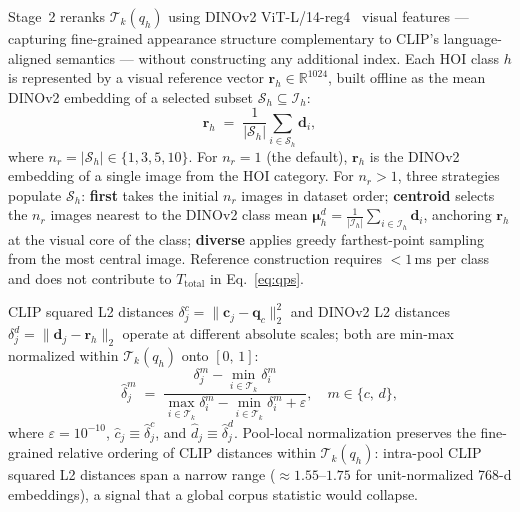 \documentclass[sigconf, nonacm]{acmart}
\theoremstyle{definition}
\begin{document}
Stage~2 reranks $\mathcal{T}_k(q_h)$ using DINOv2 ViT-L/14-reg4~\cite{oquab2024dinov2}
visual features --- capturing fine-grained appearance structure complementary to
CLIP's language-aligned semantics --- without constructing any additional index.
Each HOI class $h$ is represented by a visual reference vector
$\mathbf{r}_h \in \mathbb{R}^{1024}$, built offline as the mean DINOv2 embedding
of a selected subset $\mathcal{S}_h \subseteq \mathcal{I}_h$:
\begin{equation}
  \mathbf{r}_h \;=\; \frac{1}{|\mathcal{S}_h|} \sum_{i \in \mathcal{S}_h} \mathbf{d}_i ,
  \label{eq:refvec}
\end{equation}
where $n_r = |\mathcal{S}_h| \in \{1, 3, 5, 10\}$.
For $n_r{=}1$ (the default), $\mathbf{r}_h$ is the DINOv2 embedding of a single image
from the HOI category.
For $n_r{>}1$, three strategies populate $\mathcal{S}_h$:
\textbf{first} takes the initial $n_r$ images in dataset order;
\textbf{centroid} selects the $n_r$ images nearest to the DINOv2 class mean
$\boldsymbol{\mu}_h^d = \frac{1}{|\mathcal{I}_h|}\sum_{i \in \mathcal{I}_h}\mathbf{d}_i$,
anchoring $\mathbf{r}_h$ at the visual core of the class;
\textbf{diverse} applies greedy farthest-point sampling from the most central image.
Reference construction requires ${<}1$\,ms per class and does not contribute to
$T_{\mathrm{total}}$ in Eq.~\eqref{eq:qps}.

CLIP squared L2 distances $\delta_j^c = \|\mathbf{c}_j - \mathbf{q}_c\|_2^2$ and DINOv2 L2 distances
$\delta_j^d = \|\mathbf{d}_j - \mathbf{r}_h\|_2$ operate at different absolute scales;
both are min-max normalized within $\mathcal{T}_k(q_h)$ onto $[0,\,1]$:
\begin{equation}
  \hat{\delta}_j^m \;=\;
    \frac{\delta_j^m - \min_{i \in \mathcal{T}_k}\delta_i^m}
         {\max_{i \in \mathcal{T}_k}\delta_i^m
          - \min_{i \in \mathcal{T}_k}\delta_i^m + \varepsilon} ,
  \quad m \in \{c,\,d\},
  \label{eq:norm}
\end{equation}
where $\varepsilon = 10^{-10}$, $\hat{c}_j \equiv \hat{\delta}_j^c$, and
$\hat{d}_j \equiv \hat{\delta}_j^d$.
Pool-local normalization preserves the fine-grained relative ordering of CLIP distances
within $\mathcal{T}_k(q_h)$: intra-pool CLIP squared L2 distances span a narrow range
(${\approx}1.55$--$1.75$ for unit-normalized 768-d embeddings), a signal that a
global corpus statistic would collapse.
\end{document}
